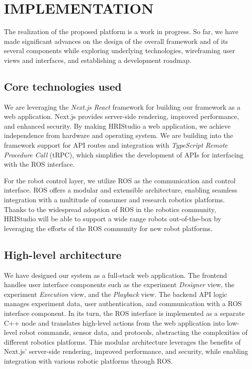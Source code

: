 \documentclass[letterpaper, 10 pt, conference]{ieeeconf}
\begin{document}
\section{IMPLEMENTATION}

The realization of the proposed platform is a work in progress. So far, we have made significant advances on the design of the overall framework and of its several components while exploring underlying technologies, wireframing user views and interfaces, and establishing a development roadmap.

\subsection{Core technologies used}

We are leveraging the \emph{Next.js React} \cite{next} framework for building our framework as a web application. Next.js provides server-side rendering, improved performance, and enhanced security. By making HRIStudio a web application, we achieve independence from hardware and operating system. We are building into the framework support for API routes and integration with \emph{TypeScript Remote Procedure Call} (tRPC), which simplifies the development of APIs for interfacing with the ROS interface.

For the robot control layer, we utilize ROS as the communication and control interface. ROS offers a modular and extensible architecture, enabling seamless integration with a multitude of consumer and research robotics platforms. Thanks to the widespread adoption of ROS in the robotics community, HRIStudio will be able to support a wide range robots out-of-the-box by leveraging the  efforts of the ROS community for new robot platforms.

\subsection{High-level architecture}

We have designed our system as a full-stack web application.  The frontend handles user interface components such as the experiment \emph{Designer} view, the experiment \emph{Execution} view, and the \emph{Playback} view. The backend API logic manages experiment data, user authentication, and communication with a ROS interface component. In its turn, the ROS interface is implemented as a separate C++ node and translates high-level actions from the web application into low-level robot commands, sensor data, and protocols, abstracting the complexities of different robotics platforms. This modular architecture leverages the benefits of Next.js' server-side rendering, improved performance, and security, while enabling integration with various robotic platforms through ROS.
\end{document}
